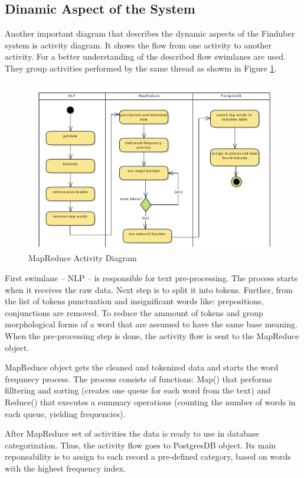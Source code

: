 \subsection{Dinamic Aspect of the System}

Another important diagram that describes the dynamic aspects of the Finduber system is activity diagram. It shows the flow from one activity to another activity. For a better understanding of the described flow swimlanes are used. They group activities performed by the same thread as showm in Figure \ref{doc_uml}. 

\begin{figure}[!ht]
\centering
\includegraphics[width=15cm]{MapReduce}
\caption{MapReduce Activity Diagram}\label{doc_uml}
\end{figure}

First swimlane -- NLP -- is responsible for text pre-processing. The process starts when it receives the raw data. Next step is to split it into tokens. Further, from the list of tokens punctuation and insignificant words like: prepositions, conjunctions are removed. To reduce the ammount of tokens and group morphological forms of a word that are assumed to have the same base meaning. When the pre-processing step is done, the activity flow is sent to the MapReduce object. 

MapReduce object gets the cleaned and tokenized data and starts the word frequnecy process. The process consists of functions: Map() that performs filltering and sorting (creates one queue for each word from the text) and Reduce() that executes a summary operations 
(counting the number of words in each queue, yielding frequencies). 

After MapReduce set of activities the data is ready to use in database categorization. Thus, the activity flow goes to PostgresDB object. Its main reponsability is to assign to each record a pre-defined category, based on words with the highest frequency index. 

